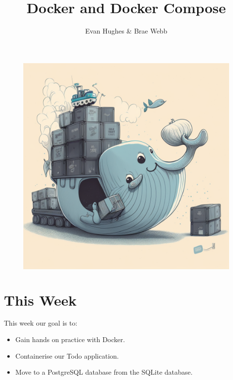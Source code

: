 \documentclass{csse4400}
\title{Docker and Docker Compose}
\author{Evan Hughes \& Brae Webb}
\date{\week[practical]{3}}
\begin{document}
\maketitle

\begin{figure}[h]
  \begin{center}
    \includegraphics[scale=0.4]{images/docker}
  \end{center}
\end{figure}


\section{This Week}
This week our goal is to:
\begin{itemize}
  \item Gain hands on practice with Docker.
  \item Containerise our Todo application.
  \item Move to a PostgreSQL database from the SQLite database.
\end{itemize}
\end{document}
